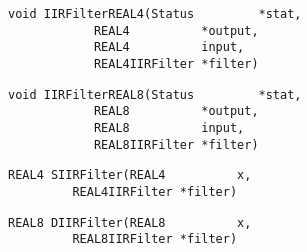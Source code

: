 \vspace{-0.1in}
\begin{verbatim}
void IIRFilterREAL4(Status         *stat,
		    REAL4          *output,
		    REAL4          input,
		    REAL4IIRFilter *filter)
\end{verbatim}
\vspace{-0.1in}
\begin{verbatim}
void IIRFilterREAL8(Status         *stat,
		    REAL8          *output,
		    REAL8          input,
		    REAL8IIRFilter *filter)
\end{verbatim}
\vspace{-0.1in}
\begin{verbatim}
REAL4 SIIRFilter(REAL4          x,
		 REAL4IIRFilter *filter)
\end{verbatim}
\vspace{-0.1in}
\begin{verbatim}
REAL8 DIIRFilter(REAL8          x,
		 REAL8IIRFilter *filter)
\end{verbatim}
